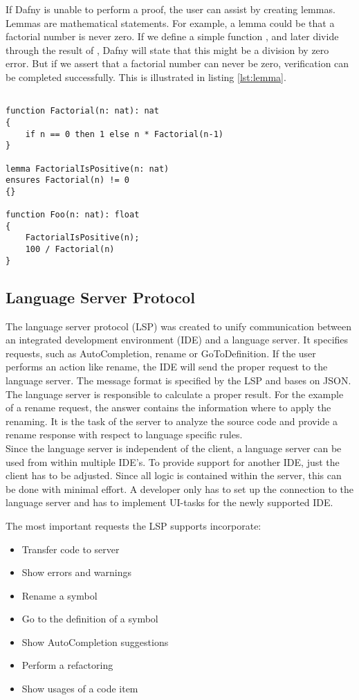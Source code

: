 If Dafny is unable to perform a proof, the user can assist by creating lemmas.
Lemmas are mathematical statements.
For example, a lemma could be that a factorial number is never zero.
If we define a simple function , and later divide through the result of , Dafny will state that this might be a division by zero error.
But if we assert that a factorial number can never be zero, verification can be completed successfully.
This is illustrated in listing \ref{lst:lemma}.
\begin{lstlisting}[language=dafny, caption={Lemmas}, captionpos=b, label={lst:lemma}]

function Factorial(n: nat): nat
{
    if n == 0 then 1 else n * Factorial(n-1)
}

lemma FactorialIsPositive(n: nat)
ensures Factorial(n) != 0
{}

function Foo(n: nat): float
{
    FactorialIsPositive(n);
    100 / Factorial(n)
}
\end{lstlisting}

\subsection{Language Server Protocol}
The language server protocol (LSP) was created to unify communication between an integrated development environment (IDE) and a language server.
It specifies requests, such as AutoCompletion, rename or GoToDefinition.
If the user performs an action like rename, the IDE will send the proper request to the language server.
The message format is specified by the LSP and bases on JSON.\\

The language server is responsible to calculate a proper result.
For the example of a rename request, the answer contains the information where to apply the renaming.
It is the task of the server to analyze the source code and provide a rename response with respect to language specific rules.\\

Since the language server is independent of the client, a language server can be used from within multiple IDE's.
To provide support for another IDE, just the client has to be adjusted.
Since all logic is contained within the server, this can be done with minimal effort.
A developer only has to set up the connection to the language server and has to implement UI-tasks for the newly supported IDE.

The most important requests the LSP supports incorporate:
\begin{itemize}
    \item Transfer code to server
    \item Show errors and warnings
    \item Rename a symbol
    \item Go to the definition of a symbol
    \item Show AutoCompletion suggestions
    \item Perform a refactoring
    \item Show usages of a code item
\end{itemize}

